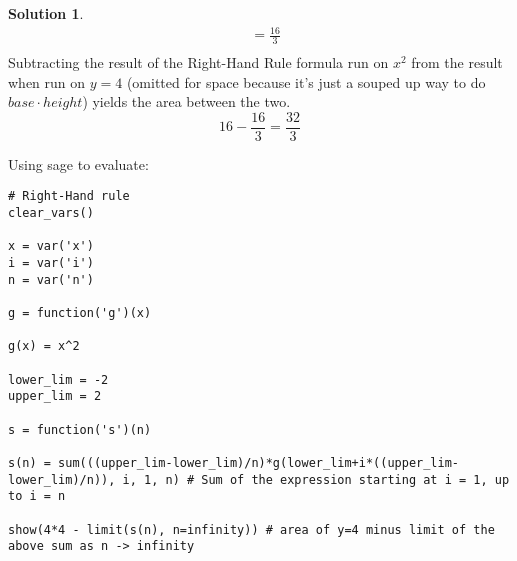 \documentclass[10pt]{article}
\theoremstyle{definition}
\newtheorem{soln}{Solution}
\begin{document}
\begin{soln}
\begin{align*}
         & = \frac{16}{3}                                                                                                                                                                                                                    \\
    \end{align*}
    Subtracting the result of the Right-Hand Rule formula run on $x^2$ from the result when run on $y=4$ (omitted for space because it's just a souped up way to do $base \cdot height$) yields the area between the two.
    $$16-\frac{16}{3}=\frac{32}{3}$$

    \noindent Using sage to evaluate:
    \begin{verbatim}
# Right-Hand rule
clear_vars()
        
x = var('x')
i = var('i')
n = var('n')
        
g = function('g')(x)
        
g(x) = x^2
        
lower_lim = -2
upper_lim = 2
        
s = function('s')(n)
        
s(n) = sum(((upper_lim-lower_lim)/n)*g(lower_lim+i*((upper_lim-lower_lim)/n)), i, 1, n) # Sum of the expression starting at i = 1, up to i = n
        
show(4*4 - limit(s(n), n=infinity)) # area of y=4 minus limit of the above sum as n -> infinity        
    \end{verbatim}
\end{soln}
\end{document}
